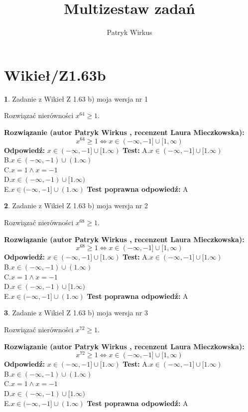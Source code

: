 \documentclass[12pt, a4paper]{article}
\title{Multizestaw zadań}
\author{Patryk Wirkus}
\date{}
\theoremstyle{definition} %
\newtheorem{zad}{}
\newcommand{\kategoria}[1]{\section{#1}}
\newcommand{\zadStart}[1]{\begin{zad}#1\newline}
\newcommand{\zadStop}{\end{zad}}
\newcommand{\rozwStart}[2]{\noindent \textbf{Rozwiązanie (autor #1 , recenzent #2): }\newline}
\newcommand{\rozwStop}{\newline}
\newcommand{\odpStart}{\noindent \textbf{Odpowiedź:}\newline}
\newcommand{\odpStop}{\newline}
\newcommand{\testStart}{\noindent \textbf{Test:}\newline}
\newcommand{\testStop}{\newline}
\newcommand{\kluczStart}{\noindent \textbf{Test poprawna odpowiedź:}\newline}
\newcommand{\kluczStop}{\newline}
\begin{document}
\maketitle

\kategoria{Wikieł/Z1.63b}


\zadStart{Zadanie z Wikieł Z 1.63 b) moja wersja nr 1}

Rozwiązać nierówności $x^{64} \ge 1$.
\zadStop
\rozwStart{Patryk Wirkus}{Laura Mieczkowska}
$$x^{64} \ge 1 \iff x \in (-\infty,-1] \cup [1,\infty)$$
\rozwStop
\odpStart
$x \in (-\infty,-1] \cup [1.\infty)$
\odpStop
\testStart
A.$x \in (-\infty,-1] \cup [1.\infty)$\\ B.$x \in (-\infty,-1) \cup (1.\infty)$\\ C.$x = 1 \wedge x = -1$\\ D.$x \in (-\infty,-1) \cup [1.\infty)$\\ E.$x \in (-\infty,-1] \cup (1.\infty)$
\testStop
\kluczStart
A
\kluczStop



\zadStart{Zadanie z Wikieł Z 1.63 b) moja wersja nr 2}

Rozwiązać nierówności $x^{68} \ge 1$.
\zadStop
\rozwStart{Patryk Wirkus}{Laura Mieczkowska}
$$x^{68} \ge 1 \iff x \in (-\infty,-1] \cup [1,\infty)$$
\rozwStop
\odpStart
$x \in (-\infty,-1] \cup [1.\infty)$
\odpStop
\testStart
A.$x \in (-\infty,-1] \cup [1.\infty)$\\ B.$x \in (-\infty,-1) \cup (1.\infty)$\\ C.$x = 1 \wedge x = -1$\\ D.$x \in (-\infty,-1) \cup [1.\infty)$\\ E.$x \in (-\infty,-1] \cup (1.\infty)$
\testStop
\kluczStart
A
\kluczStop



\zadStart{Zadanie z Wikieł Z 1.63 b) moja wersja nr 3}

Rozwiązać nierówności $x^{72} \ge 1$.
\zadStop
\rozwStart{Patryk Wirkus}{Laura Mieczkowska}
$$x^{72} \ge 1 \iff x \in (-\infty,-1] \cup [1,\infty)$$
\rozwStop
\odpStart
$x \in (-\infty,-1] \cup [1.\infty)$
\odpStop
\testStart
A.$x \in (-\infty,-1] \cup [1.\infty)$\\ B.$x \in (-\infty,-1) \cup (1.\infty)$\\ C.$x = 1 \wedge x = -1$\\ D.$x \in (-\infty,-1) \cup [1.\infty)$\\ E.$x \in (-\infty,-1] \cup (1.\infty)$
\testStop
\kluczStart
A
\kluczStop
\end{document}
